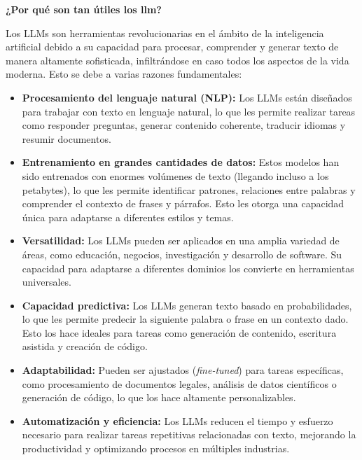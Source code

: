 \documentclass{article}
\begin{document}
\vspace{0.4cm}
\textbf{¿Por qué son tan útiles los llm?} 

Los LLMs son herramientas revolucionarias en el ámbito de la inteligencia artificial debido a su capacidad para procesar, comprender y generar texto de manera altamente sofisticada, infiltrándose en caso todos los aspectos de la vida moderna. Esto se debe a varias razones fundamentales:

\begin{itemize}
    \item \textbf{Procesamiento del lenguaje natural (NLP):} Los LLMs están diseñados para trabajar con texto en lenguaje natural, lo que les permite realizar tareas como responder preguntas, generar contenido coherente, traducir idiomas y resumir documentos.

    \item \textbf{Entrenamiento en grandes cantidades de datos:} Estos modelos han sido entrenados con enormes volúmenes de texto (llegando incluso a los petabytes), lo que les permite identificar patrones, relaciones entre palabras y comprender el contexto de frases y párrafos. Esto les otorga una capacidad única para adaptarse a diferentes estilos y temas.

    \item \textbf{Versatilidad:} Los LLMs pueden ser aplicados en una amplia variedad de áreas, como educación, negocios, investigación y desarrollo de software. Su capacidad para adaptarse a diferentes dominios los convierte en herramientas universales.

    \item \textbf{Capacidad predictiva:} Los LLMs generan texto basado en probabilidades, lo que les permite predecir la siguiente palabra o frase en un contexto dado. Esto los hace ideales para tareas como generación de contenido, escritura asistida y creación de código.

    \item \textbf{Adaptabilidad:} Pueden ser ajustados (\textit{fine-tuned}) para tareas específicas, como procesamiento de documentos legales, análisis de datos científicos o generación de código, lo que los hace altamente personalizables.

    \item \textbf{Automatización y eficiencia:} Los LLMs reducen el tiempo y esfuerzo necesario para realizar tareas repetitivas relacionadas con texto, mejorando la productividad y optimizando procesos en múltiples industrias.

\end{itemize}
\end{document}
